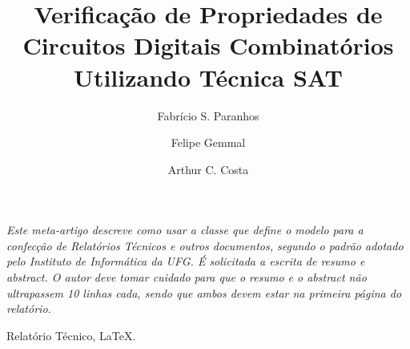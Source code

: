 \documentclass[a4paper, 12pt]{article}
\makeatletter
\newenvironment{resumo}{%
  \list{}{%
    \leftmargin=0.8cm
    \labelwidth=\z@
    \listparindent=\z@
    \itemindent\listparindent
    \rightmargin\leftmargin}\item[\hskip\labelsep
  \bfseries\itshape Resumo.]\itshape}%
{\endlist}
\newenvironment{palavras-chave}{%
  \list{}{%
    \leftmargin=0.8cm
    \labelwidth=\z@
    \listparindent=\z@
    \itemindent\listparindent
    \rightmargin\leftmargin}\item[\hskip\labelsep
  \bfseries Palavras-Chave:]}%
{\endlist}
\makeatother
\begin{document}
%
\title{\bf Verificação de Propriedades de Circuitos Digitais Combinatórios
  Utilizando Técnica SAT}

\author{Fabrício S. Paranhos\and
  Felipe Gemmal\and
  Arthur C. Costa}
\date{}

\maketitle






\begin{resumo} 
Este meta-artigo descreve como usar a classe que define o modelo para a confecção de Relatórios Técnicos e outros documentos, segundo o padrão adotado pelo Instituto de Informática da UFG. É solicitada a escrita de resumo e \textit{abstract}. O autor deve tomar cuidado para que o resumo e o \textit{abstract} não ultrapassem 10 linhas cada, sendo que ambos devem estar na primeira página do relatório.
\end{resumo}

\begin{palavras-chave}
Relatório Técnico, \LaTeX.
\end{palavras-chave}









% 
\end{document}
